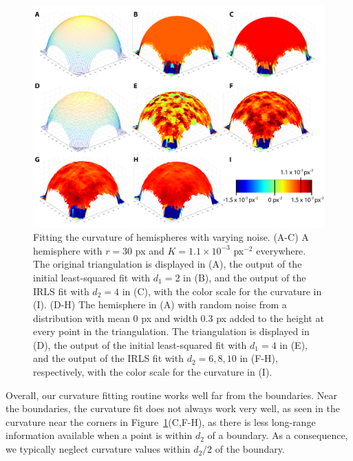 \begin{figure}
  \centering
  \includegraphics{figures/C3/Ch3-Figs_CurvFitSphere.png}
  \caption{Fitting the curvature of hemispheres with varying noise.
  (A-C) A hemisphere with $r = 30$ px and $K = 1.1 \times 10^{-3}$ px$^{-2}$ everywhere.
  The original triangulation is displayed in (A), the output of the initial least-squared fit with $d_1=2$ in (B), and the output of the IRLS fit with $d_2=4$ in (C), with the color scale for the curvature in (I).
  (D-H) The hemisphere in (A) with random noise from a distribution with mean 0 px and width 0.3 px added to the height at every point in the triangulation.
  The triangulation is displayed in (D), the output of the initial least-squared fit with $d_1=4$ in (E), and the output of the IRLS fit with $d_2=6,8,10$ in (F-H), respectively, with the color scale for the curvature in (I).}\label{f:3-CurvFitSphere}
\end{figure}

Overall, our curvature fitting routine works well far from the boundaries.
Near the boundaries, the curvature fit does not always work very well, as seen in the curvature near the corners in Figure~\ref{f:3-CurvFitSphere}(C,F-H), as there is less long-range information available when a point is within $d_2$ of a boundary.
As a consequence, we typically neglect curvature values within $d_2/2$ of the boundary.


